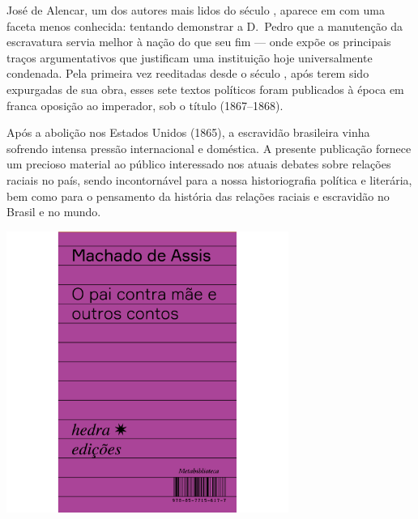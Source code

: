 \hspace*{-7cm}\hrulefill\hspace*{-7cm}

\medskip

\noindent{}José de Alencar, um dos autores mais lidos do século , aparece em {} com uma faceta menos conhecida: tentando demonstrar a D.~Pedro  que a manutenção da escravatura servia melhor à nação do que seu fim --- onde expõe os principais traços argumentativos que justificam uma instituição hoje universalmente condenada. Pela primeira vez reeditadas desde o século , após terem sido expurgadas de sua obra, esses sete textos políticos foram publicados à época em franca oposição ao imperador, sob o título {} (1867--1868).

Após a abolição nos Estados Unidos (1865), a escravidão brasileira vinha sofrendo intensa pressão internacional e doméstica. A presente publicação fornece um precioso material ao público interessado nos atuais debates sobre relações raciais no país, sendo incontornável para a nossa historiografia política e literária, bem como para o pensamento da história das relações raciais e escravidão no Brasil e no mundo.

\vfill

\hspace*{-.4cm}\begin{minipage}[c]{.5\linewidth}
\small{
{}}
\end{minipage}

\pagebreak

\begin{center}
\hspace*{.5cm}\includegraphics[width=92mm]{./grid/machado.jpg}
\end{center}

